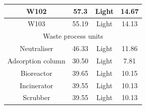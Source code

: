 \begin{table}[H]
\begin{tabular}{cccc}
W102                    &   57.3             &     Light                      &  14.67                              \\\hline
W103                    &   55.19           &     Light                      &  14.13                              \\\hline
\multicolumn{4}{c}{Waste process units}                                                        \\\hline
Neutraliser                    &   46.33            &     Light                      &   11.86                                 \\
Adsorption column                    &   30.50             &     Light                      &  7.81     \\         
Bioreactor                    &   39.65            &     Light                      &   10.15                                 \\
Incinerator                 &   39.55             &     Light                      &  10.13     \\    
Scrubber                 &   39.55             &     Light                      &  10.13     \\\bottomrule

\end{tabular}
\end{table}